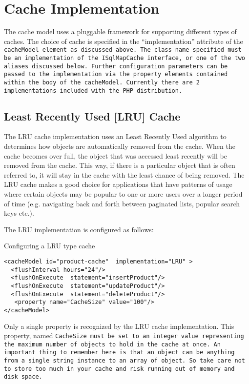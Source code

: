 \section{Cache Implementation}
The cache model uses a pluggable framework for supporting different types of
caches. The choice of cache is specified in the ``implementation'' attribute
of the \tt{cacheModel} element as discussed above. The class name specified
must be an implementation of the \tt{ISqlMapCache} interface, or one of the
two aliases discussed below. Further configuration parameters can be passed to
the implementation via the property elements contained within the body of the
\tt{cacheModel}. Currently there are 2 implementations included with the PHP
distribution.

\subsection{Least Recently Used [LRU] Cache} The LRU cache implementation uses
an Least Recently Used algorithm to determines how objects are automatically
removed from the cache. When the cache becomes over full, the object that was
accessed least recently will be removed from the cache. This way, if there is
a particular object that is often referred to, it will stay in the cache with
the least chance of being removed. The LRU cache makes a good choice for
applications that have patterns of usage where certain objects may be popular
to one or more users over a longer period of time (e.g. navigating back and
forth between paginated lists, popular search keys etc.).

The LRU implementation is configured as follows:
\begin{example}\label{example:3.48}
Configuring a LRU type cache
\begin{verbatim}
<cacheModel id="product-cache"  implementation="LRU" >
  <flushInterval hours="24"/>
  <flushOnExecute  statement="insertProduct"/>
  <flushOnExecute  statement="updateProduct"/>
  <flushOnExecute  statement="deleteProduct"/>
   <property name="CacheSize" value="100"/>
</cacheModel>
\end{verbatim}
\end{example}

Only a single property is recognized by the LRU cache implementation. This
property, named \tt{CacheSize} must be set to an integer value representing
the maximum number of objects to hold in the cache at once. An important thing
to remember here is that an object can be anything from a single string
instance to an array of object. So take care not to store too much in your
cache and risk running out of memory and disk space.

